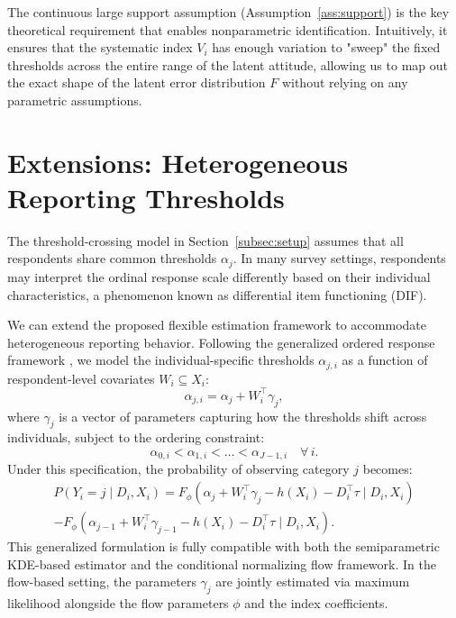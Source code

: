 \documentclass{article}
\numberwithin{figure}{section}
\numberwithin{table}{section}
\numberwithin{equation}{section}
\begin{document}
The continuous large support assumption (Assumption~\ref{ass:support}) is the key theoretical requirement that enables nonparametric identification. Intuitively, it ensures that the systematic index $V_i$ has enough variation to "sweep" the fixed thresholds across the entire range of the latent attitude, allowing us to map out the exact shape of the latent error distribution $F$ without relying on any parametric assumptions.

\clearpage

\section{Extensions: Heterogeneous Reporting Thresholds}
\label{app:heterogeneous}

The threshold-crossing model in Section~\ref{subsec:setup} assumes that all respondents share common thresholds $\alpha_j$. In many survey settings, respondents may interpret the ordinal response scale differently based on their individual characteristics, a phenomenon known as differential item functioning (DIF). 

We can extend the proposed flexible estimation framework to accommodate heterogeneous reporting behavior. Following the generalized ordered response framework \citep{Williams2006a}, we model the individual-specific thresholds $\alpha_{j,i}$ as a function of respondent-level covariates $W_i \subseteq X_i$:
\begin{equation}
\alpha_{j,i} = \alpha_j + W_i^\top \gamma_j,
\end{equation}
where $\gamma_j$ is a vector of parameters capturing how the thresholds shift across individuals, subject to the ordering constraint:
\begin{equation}
\alpha_{0,i} < \alpha_{1,i} < \dots < \alpha_{J-1,i} \quad \forall \, i.
\end{equation}
Under this specification, the probability of observing category $j$ becomes:
\begin{align}
P(Y_i = j \mid D_i, X_i) = F_\phi \left( \alpha_j + W_i^\top \gamma_j - h(X_i) - D_i^\top \tau \mid D_i, X_i \right) \nonumber \\
- F_\phi \left( \alpha_{j-1} + W_i^\top \gamma_{j-1} - h(X_i) - D_i^\top \tau \mid D_i, X_i \right).
\end{align}
This generalized formulation is fully compatible with both the semiparametric KDE-based estimator and the conditional normalizing flow framework. In the flow-based setting, the parameters $\gamma_j$ are jointly estimated via maximum likelihood alongside the flow parameters $\phi$ and the index coefficients.
\end{document}
